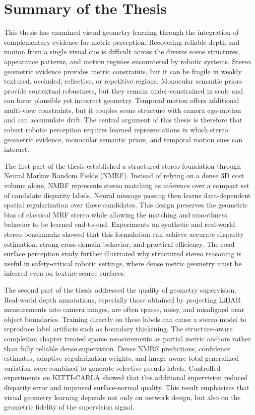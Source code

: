 \section{Summary of the Thesis}

This thesis has examined visual geometry learning through the integration of complementary evidence for metric perception.
Recovering reliable depth and motion from a single visual cue is difficult across the diverse scene structures, appearance patterns, and motion regimes encountered by robotic systems.
Stereo geometric evidence provides metric constraints, but it can be fragile in weakly textured, occluded, reflective, or repetitive regions.
Monocular semantic priors provide contextual robustness, but they remain under-constrained in scale and can favor plausible yet incorrect geometry.
Temporal motion offers additional multi-view constraints, but it couples scene structure with camera ego-motion and can accumulate drift.
The central argument of this thesis is therefore that robust robotic perception requires learned representations in which stereo geometric evidence, monocular semantic priors, and temporal motion cues can interact.

The first part of the thesis established a structured stereo foundation through Neural Markov Random Fields (NMRF).
Instead of relying on a dense 3D cost volume alone, NMRF represents stereo matching as inference over a compact set of candidate disparity labels.
Neural message passing then learns data-dependent spatial regularization over these candidates.
This design preserves the geometric bias of classical MRF stereo while allowing the matching and smoothness behavior to be learned end-to-end.
Experiments on synthetic and real-world stereo benchmarks showed that this formulation can achieve accurate disparity estimation, strong cross-domain behavior, and practical efficiency.
The road surface perception study further illustrated why structured stereo reasoning is useful in safety-critical robotic settings, where dense metric geometry must be inferred even on texture-scarce surfaces.

The second part of the thesis addressed the quality of geometry supervision.
Real-world depth annotations, especially those obtained by projecting LiDAR measurements into camera images, are often sparse, noisy, and misaligned near object boundaries.
Training directly on these labels can cause a stereo model to reproduce label artifacts such as boundary thickening.
The structure-aware completion chapter treated sparse measurements as partial metric anchors rather than fully reliable dense supervision.
Dense NMRF predictions, confidence estimates, adaptive regularization weights, and image-aware total generalized variation were combined to generate selective pseudo labels.
Controlled experiments on KITTI-CARLA showed that this additional supervision reduced disparity error and improved surface-normal quality.
This result emphasizes that visual geometry learning depends not only on network design, but also on the geometric fidelity of the supervision signal.


